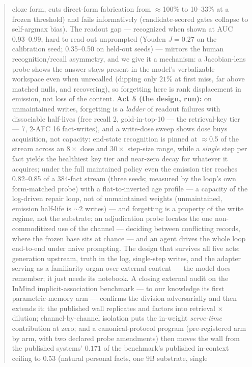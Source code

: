 \documentclass[11pt]{article}
\begin{document}
\begin{abstract}
cloze form, cuts direct-form fabrication from
$\approx$100\% to 10--33\% at a frozen threshold) and fails informatively (candidate-scored gates
collapse to self-argmax bias). The readout gap --- recognized when shown at AUC 0.93--0.99, hard
to read out unprompted (Youden $J{=}0.27$ on the calibration seed; 0.35--0.50 on held-out seeds)
--- mirrors the human recognition/recall asymmetry,
and we give it a mechanism: a Jacobian-lens probe shows the answer stays present in the model's
verbalizable workspace even when unrecalled (dipping only $21\%$ at first miss, far above matched
nulls, and recovering), so forgetting here is rank displacement in emission, not loss of the
content. \textbf{Act 5 (the design, run):} on unmaintained writes, forgetting is a \emph{ladder} of readout failures
with dissociable half-lives (free recall 2, gold-in-top-10 --- the retrieval-key tier --- 7,
2-AFC 16 fact-writes), and a write-dose sweep shows dose buys acquisition, not capacity:
end-state recognition is pinned at $\approx$0.5 of the stream across an $8\times$ dose and
$30\times$ step-size range, while a \emph{single} step per fact yields the healthiest key tier
and near-zero decay for whatever it acquires; under the full maintained policy even the emission
tier reaches 0.82--0.85 of a 384-fact stream (three seeds; measured by the loop's own
form-matched probe) with a flat-to-inverted age profile ---
a capacity of the log-driven repair loop, not of unmaintained weights (unmaintained, emission
half-life is $\sim$2 writes) --- and forgetting is a property of the write regime, not the
substrate; an adjudication probe locates the one non-commoditized use of the channel ---
deciding between conflicting records, where the frozen base sits at chance --- and an agent
drives the whole loop end-to-end under naive prompting. The design that survives all
five acts: generation
upstream, truth in the log, single-step writes, and the adapter serving as a familiarity organ
over external content --- the model does remember; it just needs its notebook.
A closing external audit on the InMind implicit-association benchmark --- to our knowledge its
first parametric-memory arm --- confirms the division adversarially and then extends it: the
published wall replicates and factors into retrieval $\times$ dilution; channel-by-channel
isolation puts the in-weight \emph{serve-time} contribution at zero; and a
canonical-protocol program (pre-registered arm by arm, with two declared probe amendments)
then moves the wall from the published systems' $0.171$ of the benchmark's published
in-context ceiling to $\mathbf{0.53}$ (natural personal facts, one $9$B substrate, single

\end{abstract}
\end{document}

